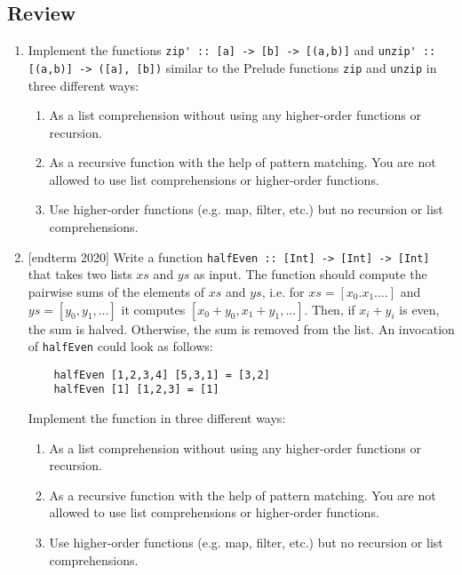\documentclass{article}
\begin{document}
\subsection{Review}
\begin{enumerate}
\item Implement the functions \verb|zip' :: [a] -> [b] -> [(a,b)]| and \verb|unzip' :: [(a,b)] -> ([a], [b])| similar to the Prelude functions \verb|zip| and \verb|unzip| in three different ways:
\begin{enumerate}
\item As a list comprehension without using any higher-order functions or recursion.
\item As a recursive function with the help of pattern matching. You are not allowed to use list comprehensions or higher-order functions.
\item Use higher-order functions (e.g. map, filter, etc.) but no recursion or list comprehensions.
\end{enumerate}

\item {[endterm 2020]} Write a function \verb|halfEven :: [Int] -> [Int] -> [Int]| that takes two lists $xs$ and $ys$ as input. The function should compute the pairwise sums of the elements of $xs$ and $ys$, i.e. for $xs = [x_0. x_1. \dots]$ and $ys = [y_0, y_1, \dots]$ it computes $[x_0 + y_0, x_1 + y_1, \dots]$. Then, if $x_i + y_i$ is even, the sum is halved. Otherwise, the sum is removed from the list. An invocation of \verb|halfEven| could look as follows:
\begin{verbatim}
    halfEven [1,2,3,4] [5,3,1] = [3,2]
    halfEven [1] [1,2,3] = [1]
\end{verbatim}
Implement the function in three different ways:
\begin{enumerate}
\item As a list comprehension without using any higher-order functions or recursion.
\item As a recursive function with the help of pattern matching. You are not allowed to use list comprehensions or higher-order functions.
\item Use higher-order functions (e.g. map, filter, etc.) but no recursion or list comprehensions.
\end{enumerate}


\end{enumerate}
\end{document}
